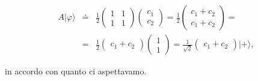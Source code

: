 \documentclass[a4paper,12pt,oneside]{book}
\begin{document}
\begin{eqnarray}
A | \varphi \rangle &\doteq & \frac{1}{2}
\begin{pmatrix}
1 & 1\\
1 & 1
\end{pmatrix}
\begin{pmatrix}
c_1\\
c_2
\end{pmatrix}=
\frac{1}{2}
\begin{pmatrix}
c_1+c_2\\
c_1+c_2
\end{pmatrix}=\nonumber \\
&=& \frac{1}{2}
\begin{pmatrix}
c_1 + c_2
\end{pmatrix}
\begin{pmatrix}
1\\
1
\end{pmatrix}=
\frac{1}{\sqrt{2}}
\begin{pmatrix}
c_1 + c_2
\end{pmatrix}
| + \rangle ,
\end{eqnarray}

in accordo con quanto ci aspettavamo.
\end{document}
